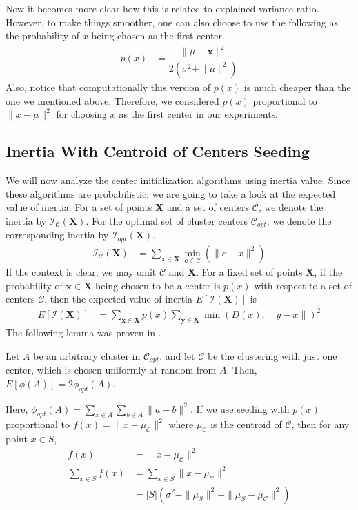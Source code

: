 \documentclass[twoside, 11pt]{article}
\newcommand{\x}{\mathbf{x}}
\newcommand{\X}{\mathbf{X}}
\newcommand{\y}{\mathbf{y}}
\renewcommand{\c}{\mathbf{c}}
\newcommand{\C}{\mathcal{C}}
\newcommand{\I}{\mathcal{I}}
\begin{document}
	Now it becomes more clear how this is related to explained variance ratio. However, to make things smoother, one can also choose to use the following as the probability of $x$ being chosen as the first center.
		\begin{align*}
			p(x) & = \dfrac{\|\mu-\x\|^2}{2(\sigma^2+\|\mu\|^2)}
		\end{align*}
	Also, notice that computationally this version of $p(x)$ is much cheaper than the one we mentioned above. Therefore, we considered $p(x)$ proportional to $\|x-\mu\|^2$ for choosing $x$ as the first center in our experiments.
	\subsection{Inertia With Centroid of Centers Seeding}
	We will now analyze the center initialization algorithms using inertia value. Since these algorithms are probabilistic, we are going to take a look at the expected value of inertia. For a set of points $\X$ and a set of centers $\C$, we denote the inertia by $\I_\C(\X)$. For the optimal set of cluster centers $\C_{opt}$, we denote the corresponding inertia by $\I_{opt}(\X)$.
		\begin{align*}
			\I_\C(\X) & = \sum_{\x\in\X}\min_{\c\in\C}(\|c-x\|^2)
		\end{align*}
	If the context is clear, we may omit $\C$ and $\X$. For a fixed set of points $\X$, if the probability of $\x\in\X$ being chosen to be a center is $p(x)$ with respect to a set of centers $\C$, then the expected value of inertia $E[\I(\X)]$ is
		\begin{align*}
			E[\I(\X)] & = \sum_{\x\in\X}p(x)\sum_{\y\in\X}\min(D(x),\|y-x\|)^2
		\end{align*}
	The following lemma was proven in \cite[Lemma $3.2$]{kmeans++}.
		\begin{lemma}
			Let $A$ be an arbitrary cluster in $\C_{opt}$, and let $\C$ be the clustering with just one center, which is chosen uniformly at random from $A$. Then, $E[\phi(A)]=2\phi_{opt}(A)$.
		\end{lemma}
	Here, $\phi_{opt}(A)=\sum_{x\in A}\sum_{b\in A}\|a-b\|^2$. If we use seeding with $p(x)$ proportional to $f(x)=\|x-\mu_{\C}\|^2$ where $\mu_{\C}$ is the centroid of $\mathcal{C}$, then for any point $x\in S$,
		\begin{align*}
			f(x) & = \|x-\mu_{\C}\|^2\\
			\sum_{x\in S}f(x) 
				& = \sum_{x\in S}\|x-\mu_{\C}\|^2\\
				& = |S|(\sigma^2+\|\mu_S\|^2+\|\mu_S-\mu_{\C}\|^2)
		\end{align*}
\end{document}
